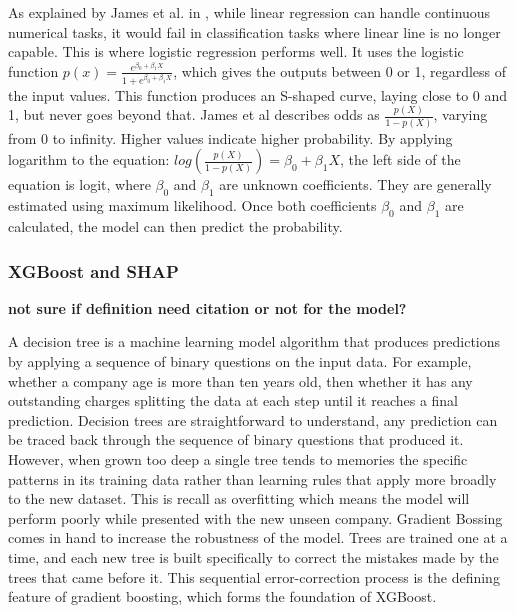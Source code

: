 \documentclass[ %
                    author={Natchalin Iwsakul \\ Inkaphol Siriwongwattana \\ Tanaphan Kummaraphat \\ Patorn Srisupap},
                supervisor={Fernando Moreno-Pino},
                    degree={MSc},
                     title={Propensity Modelling for SME Commercial Lending Using Open Public Data},
                  subtitle={Companies House filings and GDELT media coverage as predictors of first-time borrowing},
                      type={},
                      year={2026}]{dissertation}
\begin{document}
As explained by James et al. in \cite{james_introduction_2013}, while linear regression can handle continuous numerical tasks, it would fail in classification tasks where linear line is no longer capable. This is where logistic regression performs well. It uses the logistic function \(p(x) = \frac{e^{\beta_0 + \beta_1 X}}{1 + e^{\beta_0 +\beta_1 X}}\), which gives the outputs between 0 or 1, regardless of the input values. This function produces an S-shaped curve, laying close to 0 and 1, but never goes beyond that. James et al \cite{james_introduction_2013} describes odds as \( \frac{p(X)}{1-p(X)}\), varying from 0 to infinity. Higher values indicate higher probability. By applying logarithm to the equation: \( log(\frac{p(X)}{1-p(X)}) = \beta_0 + \beta_1X\), the left side of the equation is logit, where \(\beta_0\) and \(\beta_1\) are unknown coefficients. They are generally estimated using maximum likelihood. Once both coefficients \(\beta_0\) and \(\beta_1\) are calculated, the model can then predict the probability.






\subsubsection{XGBoost and SHAP}

\textbf{not sure if definition need citation or not for the model?}

A decision tree is a machine learning model algorithm that produces predictions by applying a sequence of binary questions on the input data. For example, whether a company age is more than ten years old, then whether it has any outstanding charges splitting the data at each step until it reaches a final prediction. Decision trees are straightforward to understand, any prediction can be traced back through the sequence of binary questions that produced it. However, when grown too deep a single tree tends to memories the specific patterns in its training data rather than learning rules that apply more broadly to the new dataset. This is recall as overfitting which means the model will perform poorly while presented with the new unseen company.
Gradient Bossing comes in hand to increase the robustness of the model. Trees are trained one at a time, and each new tree is built specifically to correct the mistakes made by the trees that came before it. This sequential error-correction process is the defining feature of gradient boosting, which forms the foundation of XGBoost.
\end{document}
